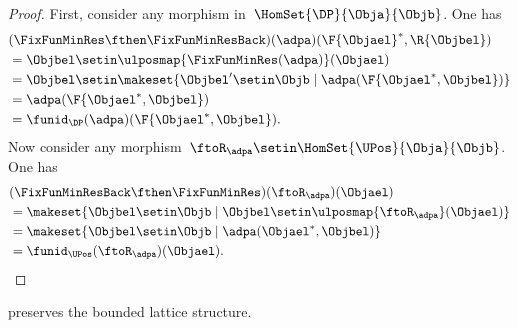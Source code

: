 \begin{proof}
    First, consider any morphism in~$\HomSet{\DP}{\Obja}{\Objb}$.
    One has
    \begin{equation}
        \begin{aligned}
             & (\FixFunMinRes \fthen \FixFunMinResBack)(\adpa)(\F{\Objael}^*,\R{\Objbel}) \\
             & = \Objbel \setin \ulposmap{\FixFunMinRes(\adpa)}(\Objael) \\
             & =\Objbel \setin \makeset{ \Objbel' \setin \Objb \mid \adpa(\F{\Objael^*,\Objbel})} \\
             & =\adpa(\F{\Objael^*,\Objbel}) \\
             & =\funid_\DP(\adpa)(\F{\Objael^*,\Objbel}).
        \end{aligned}
    \end{equation}
    Now consider any morphism~$\ftoR_\adpa \setin \HomSet{\UPos}{\Obja}{\Objb}$.
    One has
    \begin{equation}
        \begin{aligned}
             & (\FixFunMinResBack \fthen \FixFunMinRes)(\ftoR_\adpa)(\Objael) \\
             & =\makeset{ \Objbel \setin \Objb\mid \Objbel \setin \ulposmap{\ftoR_\adpa}(\Objael)} \\
             & =\makeset{ \Objbel \setin \Objb\mid \adpa(\Objael^*,\Objbel)} \\
             & =\funid_\UPos(\ftoR_\adpa)(\Objael).
        \end{aligned}
    \end{equation}

\end{proof}
\begin{lemma}
    \FixFunMinRes preserves the bounded lattice structure.
\end{lemma}
